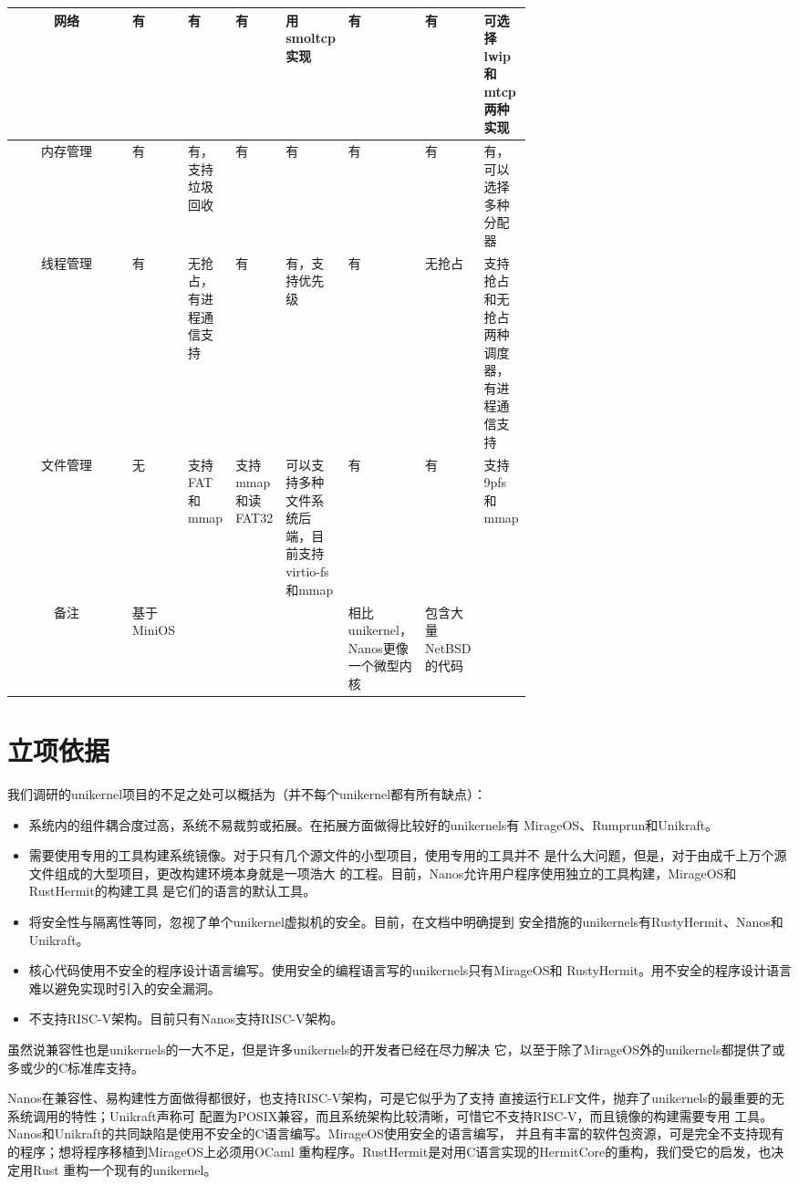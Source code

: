 \documentclass{../runikraft-report}
\begin{document}
\begin{longtable}{|c*{7}{|>{\centering\arraybackslash}p{0.095\linewidth}}|}
网络&有&有&有&用smoltcp实现&有&有&可选择lwip和mtcp两种实现\\\hline
内存管理&有&有，支持垃圾回收&有&有&有&有&有，可以选择多种分配器\\\hline
线程管理&有&无抢占，有进程通信支持&有&有，支持优先级&有&无抢占&支持抢占和无抢占两种调度器，有进程通信支持\\\hline
文件管理&无&支持FAT和mmap&支持mmap和读FAT32&可以支持多种文件系统后端，目前支持virtio-fs和mmap&有&有&支持9pfs和mmap\\\hline
备注&基于MiniOS&&&&相比unikernel，Nanos更像一个微型内核&包含大量NetBSD的代码&\\\hline
\end{longtable}
\normalsize


\section{立项依据}
我们调研的unikernel项目的不足之处可以概括为（并不每个unikernel都有所有缺点）：
\begin{itemize}
\item 系统内的组件耦合度过高，系统不易裁剪或拓展。在拓展方面做得比较好的unikernels有
MirageOS、Rumprun和Unikraft。
\item 需要使用专用的工具构建系统镜像。对于只有几个源文件的小型项目，使用专用的工具并不
是什么大问题，但是，对于由成千上万个源文件组成的大型项目，更改构建环境本身就是一项浩大
的工程。目前，Nanos允许用户程序使用独立的工具构建，MirageOS和RustHermit的构建工具
是它们的语言的默认工具。
\item 将安全性与隔离性等同，忽视了单个unikernel虚拟机的安全。目前，在文档中明确提到
安全措施的unikernels有RustyHermit、Nanos和Unikraft。
\item 核心代码使用不安全的程序设计语言编写。使用安全的编程语言写的unikernels只有MirageOS和
RustyHermit。用不安全的程序设计语言难以避免实现时引入的安全漏洞。
\item 不支持RISC-V架构。目前只有Nanos支持RISC-V架构。
\end{itemize}
虽然说兼容性也是unikernels的一大不足，但是许多unikernels的开发者已经在尽力解决
它，以至于除了MirageOS外的unikernels都提供了或多或少的C标准库支持。

Nanos在兼容性、易构建性方面做得都很好，也支持RISC-V架构，可是它似乎为了支持
直接运行ELF文件，抛弃了unikernels的最重要的无系统调用的特性；Unikraft声称可
配置为POSIX兼容，而且系统架构比较清晰，可惜它不支持RISC-V，而且镜像的构建需要专用
工具。Nanos和Unikraft的共同缺陷是使用不安全的C语言编写。MirageOS使用安全的语言编写，
并且有丰富的软件包资源，可是完全不支持现有的程序；想将程序移植到MirageOS上必须用OCaml
重构程序。RustHermit是对用C语言实现的HermitCore的重构，我们受它的启发，也决定用Rust
重构一个现有的unikernel。
\end{document}
